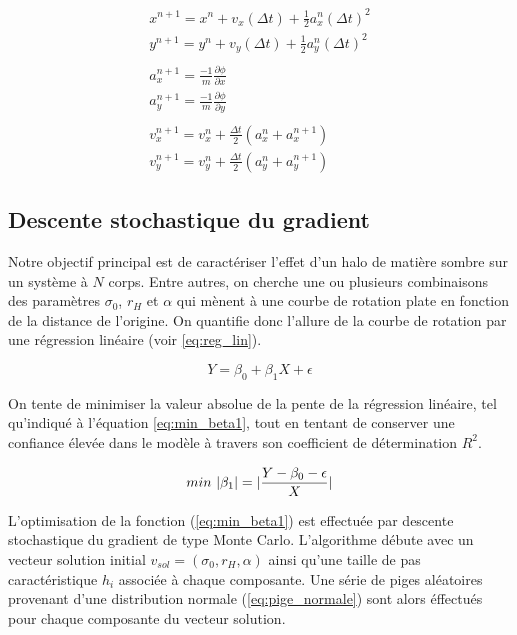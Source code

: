 \documentclass{article}
\DeclarePairedDelimiter\absol{\lvert}{\rvert}%
\begin{document}
\begin{equation}\label{eq:verlet}
	\begin{gathered}
	x^{n+1} = x^n + v_x(\Delta t) + \frac{1}{2}a_x^n (\Delta t)^2\\
	y^{n+1} = y^n + v_y(\Delta t) + \frac{1}{2}a_y^n (\Delta t)^2\\
	\\
	a_x^{n+1} = \frac{-1}{m} \frac{\partial \phi}{\partial x}\\
	a_y^{n+1} = \frac{-1}{m} \frac{\partial \phi}{\partial y}\\
	\\
	v_x^{n+1} = v_x^n + \frac{\Delta t}{2} (a_x^n + a_x^{n+1})\\
	v_y^{n+1} = v_y^n + \frac{\Delta t}{2} (a_y^n + a_y^{n+1})
	\end{gathered}
\end{equation}

\subsection{Descente stochastique du gradient}

Notre objectif principal est de caractériser l'effet d'un halo de matière sombre sur un système à $N$ corps. Entre autres, on cherche une ou plusieurs combinaisons des paramètres $\sigma_0$, $r_H$ et $\alpha$ qui mènent à une courbe de rotation plate en fonction de la distance de l'origine. On quantifie donc l'allure de la courbe de rotation par une régression linéaire (voir \ref{eq:reg_lin}). 

\begin{equation}\label{eq:reg_lin}
	Y = \beta_0 + \beta_1 X + \epsilon
\end{equation}

On tente de minimiser la valeur absolue de la pente de la régression linéaire, tel qu'indiqué à l'équation \ref{eq:min_beta1}, tout en tentant de conserver une confiance élevée dans le modèle à travers son coefficient de détermination $R^2$.

\begin{equation}\label{eq:min_beta1}
	min\ \absol{\beta_1} = \absol{\frac{Y - \beta_0 - \epsilon}{X}}
\end{equation}

L'optimisation de la fonction (\ref{eq:min_beta1}) est effectuée par descente stochastique du gradient de type Monte Carlo. L'algorithme débute avec un vecteur solution initial $v_{sol} = (\sigma_0, r_H, \alpha)$ ainsi qu'une taille de pas caractéristique $h_i$ associée à chaque composante. Une série de piges aléatoires provenant d'une distribution normale (\ref{eq:pige_normale}) sont alors éffectués pour chaque composante du vecteur solution. 
\end{document}
